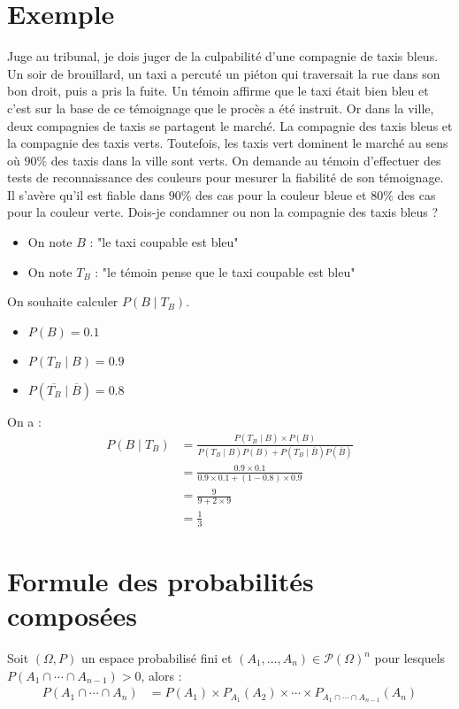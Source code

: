 \documentclass[../main.tex]{subfiles}
\begin{document}
\section{Exemple}
\begin{tcolorbox}[title=Exemple 32.35, title filled=false, colframe=darkgreen, colback=darkgreen!10!white]
    Juge au tribunal, je dois juger de la culpabilité d'une compagnie de taxis bleus. Un soir de brouillard, un taxi a percuté un piéton qui traversait la rue dans son bon droit, puis a pris la fuite. Un témoin affirme que le taxi était bien bleu et c'est sur la base de ce témoignage que le procès a été instruit. Or dans la ville, deux compagnies de taxis se partagent le marché. La compagnie des taxis bleus et la compagnie des taxis verts. Toutefois, les taxis vert dominent le marché au sens où $90 \%$ des taxis dans la ville sont verts.
    On demande au témoin d'effectuer des tests de reconnaissance des couleurs pour mesurer la fiabilité de son témoignage. Il s'avère qu'il est fiable dans $90 \%$ des cas pour la couleur bleue et $80 \%$ des cas pour la couleur verte. Dois-je condamner ou non la compagnie des taxis bleus ?
\end{tcolorbox}

\begin{itemize}
    \item On note $B$ : "le taxi coupable est bleu"
    \item On note $T_B$ : "le témoin pense que le taxi coupable est bleu"
\end{itemize}
On souhaite calculer $P(B \mid T_B)$. 
\begin{itemize}
    \item $P(B) = 0.1$
    \item $P(T_B \mid B) = 0.9$
    \item $P(\overline{T_B} \mid \overline{B}) = 0.8$
\end{itemize}
On a : 
\begin{align*}
    P(B\mid T_B) &= \frac{P(T_B \mid B)\times P(B)}{P(T_B\mid B)P(B) + P(T_B \mid \overline{B})P(\overline{B})} \\
    &= \frac{0.9 \times 0.1}{0.9 \times 0.1 + (1 - 0.8) \times 0.9} \\
    &= \frac{9}{9 + 2\times 9} \\
    &= \frac{1}{3}
\end{align*}

\section{Formule des probabilités composées}
\begin{tcolorbox}[title=Théorème 32.37, title filled=false, colframe=orange, colback=orange!10!white]
    Soit $(\Omega, P)$ un espace probabilisé fini et $(A_1, \ldots, A_n)\in \mathcal{P}(\Omega)^n$ pour lesquels $P(A_1\cap\cdots\cap A_{n-1})>0$, alors : 
    \begin{align*}
        P(A_1 \cap \cdots \cap A_n) &= P(A_1)\times P_{A_1}(A_2)\times \cdots \times P_{A_1\cap\cdots\cap A_{n-1}}(A_n)
    \end{align*}
\end{tcolorbox}
\end{document}
